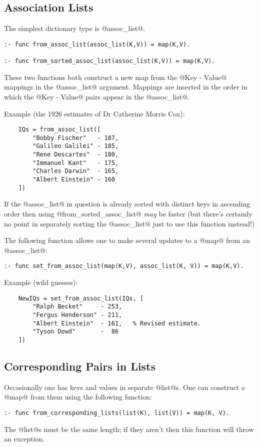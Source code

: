 \subsection{Association Lists}

The simplest dictionary type is @assoc_list@.
\begin{verbatim}
:- func from_assoc_list(assoc_list(K,V)) = map(K,V).

:- func from_sorted_assoc_list(assoc_list(K,V)) = map(K,V).
\end{verbatim}
These two functions both construct a new map from the @Key - Value@
mappings in the @assoc_list@ argument.  Mappings are inserted in the
order in which the @Key - Value@ pairs appear in the @assoc_list@.

Example (the 1926 estimates of Dr Catherine Morris Cox):
\begin{verbatim}
    IQs = from_assoc_list([
        "Bobby Fischer"   - 187,
        "Galileo Galilei" - 185,
        "Rene Descartes"  - 180,
        "Immanuel Kant"   - 175,
        "Charles Darwin"  - 165,
        "Albert Einstein" - 160
    ])
\end{verbatim}
If the @assoc_list@ in question is already sorted with distinct keys in
ascending order then using @from_sorted_assoc_list@ \emph{may} be faster
(but there's certainly no point in separately sorting the @assoc_list@
just to use this function instead!)  

The following function allows one to make several updates to a @map@
from an @assoc_list@:
\begin{verbatim}
:- func set_from_assoc_list(map(K,V), assoc_list(K, V)) = map(K,V).
\end{verbatim}

Example (wild guesses):
\begin{verbatim}
    NewIQs = set_from_assoc_list(IQs, [
        "Ralph Becket"     - 253,
        "Fergus Henderson" - 211,
        "Albert Einstein"  - 161,   % Revised estimate.
        "Tyson Dowd"       -  86
    ])
\end{verbatim}

\subsection{Corresponding Pairs in Lists}

Occasionally one has keys and values in separate @list@s.  One can
construct a @map@ from them using the following function:
\begin{verbatim}
:- func from_corresponding_lists(list(K), list(V)) = map(K, V).
\end{verbatim}
The @list@s must be the same length; if they aren't then this 
function will throw an exception.

